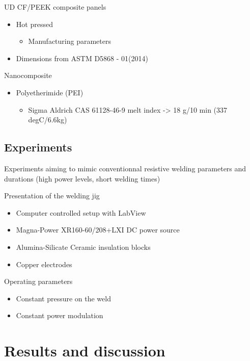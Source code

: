 \documentclass[11pt,review,times]{elsarticle}
\begin{document}
UD CF/PEEK composite panels
\begin{itemize}
	\item Hot pressed
	\begin{itemize}
		\item Manufacturing parameters
	\end{itemize}
	\item Dimensions from ASTM D5868 - 01(2014)
\end{itemize}

Nanocomposite
\begin{itemize}
	\item Polyetherimide (PEI)
	\begin{itemize}
		\item Sigma Aldrich CAS 61128-46-9 melt index -> 18 g/10 min (337 degC/6.6kg) 
	\end{itemize}
\end{itemize}


\subsection{Experiments}

Experiments aiming to mimic conventionnal resistive welding parameters and durations (high power levels, short welding times)

Presentation of the welding jig
\begin{itemize}
	\item Computer controlled setup with LabView
	\item Magna-Power XR160-60/208+LXI DC power source
	\item Alumina-Silicate Ceramic insulation blocks
	\item Copper electrodes
\end{itemize}

Operating parameters
\begin{itemize}
	\item Constant pressure on the weld
	\item Constant power modulation
\end{itemize}


							\section{Results and discussion}
\end{document}
